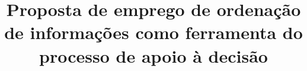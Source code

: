 \documentclass[a4paper,12pt]{article}
\begin{document}
\onehalfspacing
\newcommand{\linhaDupla}{\newline \newline}


% 
% 
\title{Proposta de emprego de ordenação de informações como ferramenta do processo de apoio à decisão}
\maketitle
\end{document}
